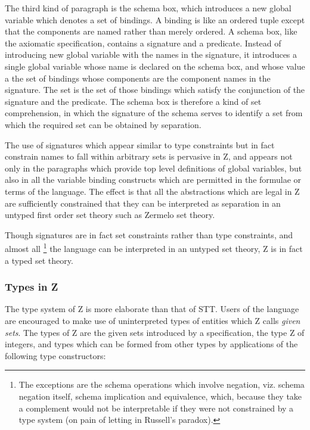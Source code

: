 \documentclass[10pt,titlepage]{book}
\begin{document}
The third kind of paragraph is the schema box, which introduces a new global variable which denotes a set of bindings.
A binding is like an ordered tuple except that the components are named rather than merely ordered.
A schema box, like the axiomatic specification, contains a signature and a predicate.
Instead of introducing new global variable with the names in the signature, it introduces a single global variable whose name is declared on the schema box, and whose value a the set of bindings whose components are the component names in the signature.
The set is the set of those bindings which satisfy the conjunction of the signature and the predicate.
The schema box is therefore a kind of set comprehension, in which the signature of the schema serves to identify a set from which the required set can be obtained by separation.

The use of signatures which appear similar to type constraints but in fact constrain names to fall within arbitrary sets is pervasive in Z, and appears not only in the paragraphs which provide top level definitions of global variables, but also in all the variable binding constructs which are permitted in the formulae or terms of the language.
The effect is that all the abstractions which are legal in Z are sufficiently constrained that they can be interpreted as separation in an untyped first order set theory such as Zermelo set theory.

Though signatures are in fact set constraints rather than type constraints, and almost all
\footnote{The exceptions are the schema operations which involve negation, viz. schema negation itself, schema implication and equivalence, which, because they take a complement would not be interpretable if they were not constrained by a type system (on pain of letting in Russell's paradox).}
 the language can be interpreted in an untyped set theory, Z is in fact a typed set theory.

\subsubsection{Types in Z}

The type system of Z is more elaborate than that of STT.
Users of the language are encouraged to make use of uninterpreted types of entities which Z calls {\it given sets}.
The types of Z are the given sets introduced by a specification, the type Z of integers, and types which can be formed from other types by applications of the following type constructors:
\end{document}
